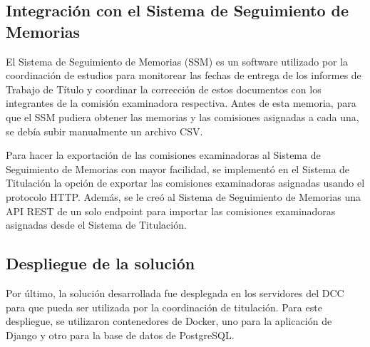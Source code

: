 \subsection{Integración con el Sistema de Seguimiento de Memorias}
El Sistema de Seguimiento de Memorias (SSM) es un software utilizado por la coordinación de
estudios para monitorear las fechas de entrega de los informes de Trabajo de Título y
coordinar la corrección de estos documentos con los integrantes de la comisión examinadora
respectiva. Antes de esta memoria, para que el SSM pudiera obtener las memorias y las
comisiones asignadas a cada una, se debía subir manualmente un archivo CSV.

Para hacer la exportación de las comisiones examinadoras al Sistema de Seguimiento de
Memorias con mayor facilidad, se implementó en el Sistema de Titulación la opción de exportar
las comisiones examinadoras asignadas usando el protocolo HTTP. Además, se le creó al Sistema de
Seguimiento de Memorias una API REST de un solo endpoint para importar las comisiones examinadoras
asignadas desde el Sistema de Titulación.

\subsection{Despliegue de la solución}\label{sec:intro:despliegue}
Por último, la solución desarrollada fue desplegada en los servidores del DCC para que
pueda ser utilizada por la coordinación de titulación. Para este despliegue, se
utilizaron contenedores de Docker, uno para la aplicación de Django y otro para la base
de datos de PostgreSQL.